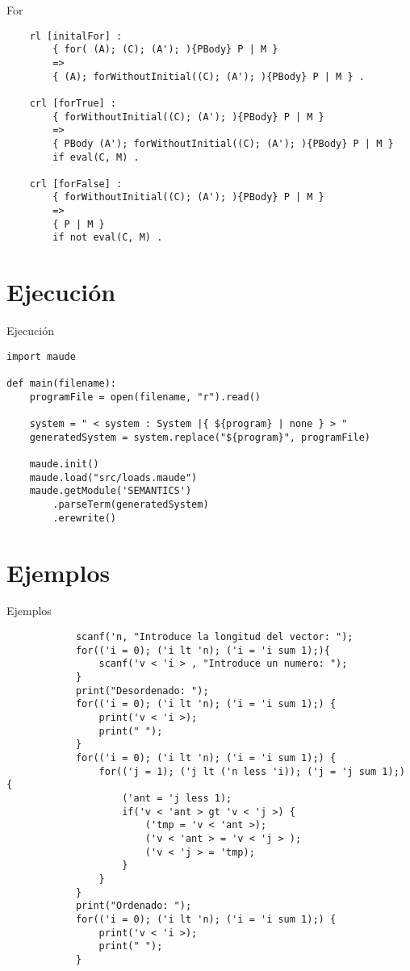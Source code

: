\documentclass{beamer}
\begin{document}
    \begin{frame}[fragile]{For}
        \begin{verbatim}  
    rl [initalFor] :
        { for( (A); (C); (A'); ){PBody} P | M }
        =>
        { (A); forWithoutInitial((C); (A'); ){PBody} P | M } .
    
    crl [forTrue] :
        { forWithoutInitial((C); (A'); ){PBody} P | M }
        =>
        { PBody (A'); forWithoutInitial((C); (A'); ){PBody} P | M }
        if eval(C, M) .
    
    crl [forFalse] :
        { forWithoutInitial((C); (A'); ){PBody} P | M }
        =>
        { P | M }
        if not eval(C, M) .
        \end{verbatim}
    \end{frame}

    \section{Ejecución}
    \begin{frame}[fragile]{Ejecución}
        \begin{verbatim}  
import maude
     
def main(filename):
    programFile = open(filename, "r").read()
            
    system = " < system : System |{ ${program} | none } > "
    generatedSystem = system.replace("${program}", programFile)
            
    maude.init()
    maude.load("src/loads.maude")
    maude.getModule('SEMANTICS')
        .parseTerm(generatedSystem)
        .erewrite()
        \end{verbatim}
    \end{frame}
    
    \section{Ejemplos}
    \begin{frame}[fragile]{Ejemplos}
        \begin{verbatim}  
            scanf('n, "Introduce la longitud del vector: ");
            for(('i = 0); ('i lt 'n); ('i = 'i sum 1);){
                scanf('v < 'i > , "Introduce un numero: ");
            }
            print("Desordenado: ");
            for(('i = 0); ('i lt 'n); ('i = 'i sum 1);) {
                print('v < 'i >);
                print(" ");
            }
            for(('i = 0); ('i lt 'n); ('i = 'i sum 1);) {
                for(('j = 1); ('j lt ('n less 'i)); ('j = 'j sum 1);) {
                    ('ant = 'j less 1);
                    if('v < 'ant > gt 'v < 'j >) {
                        ('tmp = 'v < 'ant >);
                        ('v < 'ant > = 'v < 'j > );
                        ('v < 'j > = 'tmp);
                    }
                }
            }
            print("Ordenado: ");
            for(('i = 0); ('i lt 'n); ('i = 'i sum 1);) {
                print('v < 'i >);
                print(" ");
            }
        \end{verbatim}
    \end{frame}
\end{document}
